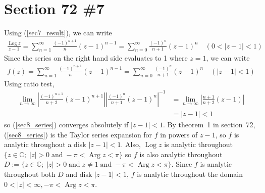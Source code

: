 \documentclass{scrartcl}
\begin{document}
\section{Section 72 \#7}
Using (\ref{sec7_result}), we can write
\begin{align*}
  \frac{\operatorname{Log} z}{z - 1}
  = \sum^\infty_{n = 1} \frac{(-1)^{n + 1}}{n} (z - 1)^{n - 1} = \sum^\infty_{n = 0} \frac{(-1)^n}{n + 1} (z - 1)^n \quad (0 < |z - 1| < 1)
\end{align*}
Since the series on the right hand side evaluates to 1 where \(z = 1\), we can write
\begin{align}\label{sec8_series}
  f(z)
  = \sum^\infty_{n = 1} \frac{(-1)^{n + 1}}{n} (z - 1)^{n - 1} = \sum^\infty_{n = 0} \frac{(-1)^n}{n + 1} (z - 1)^n \quad (|z - 1| < 1)
\end{align}
Using ratio test,
\begin{align*}
  \lim_{n \to \infty} \left| \frac{(-1)^{n + 1}}{n + 2} (z - 1)^{n + 1} \right| \left| \frac{(-1)^n}{n + 1} (z - 1)^n \right|^{-1}
  &= \lim_{n \to \infty} \left| \frac{n + 1}{n + 2} (z - 1) \right| \\
  &= |z - 1| < 1
\end{align*}
so (\ref{sec8_series}) converges absolutely if \(|z - 1| < 1\).
By theorem~1 in section~72, (\ref{sec8_series}) is the Taylor series expansion for \(f\) in powers of \(z - 1\), so \(f\) is analytic throughout a disk \(|z - 1| < 1\).
Also, \(\operatorname{Log} z\) is analytic throughout \(\{z \in \mathbb{C};\; |z| > 0\; \text{and}\; -\pi < \operatorname{Arg} z < \pi\}\) so \(f\) is also analytic throughout \(D := \{z \in \mathbb{C};\; |z| > 0\; \text{and}\; z \not = 1\; \text{and}\; -\pi < \operatorname{Arg} z < \pi\}\).
Since \(f\) is analytic throughout both \(D\) and disk \(|z - 1| < 1\), \(f\) is analytic throughout the domain \(0 < |z| < \infty, -\pi < \operatorname{Arg} z < \pi\).
\end{document}
